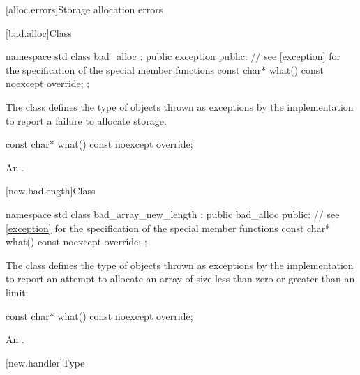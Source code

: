 [alloc.errors]{Storage allocation errors}

[bad.alloc]{Class }%
%

%
\begin{codeblock}
namespace std {
  class bad_alloc : public exception {
  public:
    // see \ref{exception} for the specification of the special member functions
    const char* what() const noexcept override;
  };
}
\end{codeblock}

\pnum
The class
defines the type of objects thrown as
exceptions by the implementation to report a failure to allocate storage.

%
\begin{itemdecl}
const char* what() const noexcept override;
\end{itemdecl}

\begin{itemdescr}
\pnum
\returns
An  \ntbs{}.
\end{itemdescr}

[new.badlength]{Class }%
%
%

\begin{codeblock}
namespace std {
  class bad_array_new_length : public bad_alloc {
  public:
    // see \ref{exception} for the specification of the special member functions
    const char* what() const noexcept override;
  };
}
\end{codeblock}

\pnum
The class  defines the type of objects thrown as
exceptions by the implementation to report an attempt to allocate an array of size
less than zero or
greater than an  limit.

%
\begin{itemdecl}
const char* what() const noexcept override;
\end{itemdecl}

\begin{itemdescr}
\pnum
\returns
An  \ntbs{}.
\end{itemdescr}

[new.handler]{Type }

